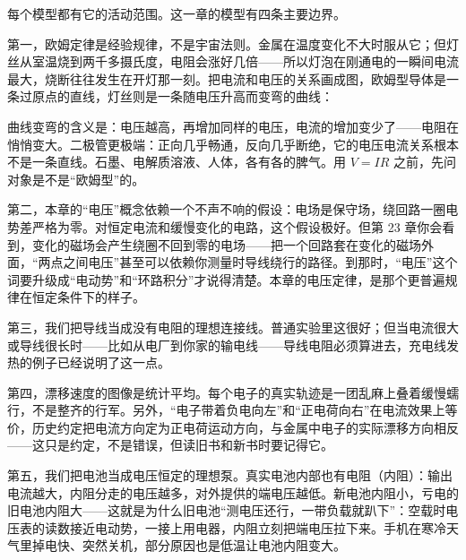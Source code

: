 
每个模型都有它的活动范围。这一章的模型有四条主要边界。

第一，欧姆定律是经验规律，不是宇宙法则。金属在温度变化不大时服从它；但灯丝从室温烧到两千多摄氏度，电阻会涨好几倍——所以灯泡在刚通电的一瞬间电流最大，烧断往往发生在开灯那一刻。把电流和电压的关系画成图，欧姆型导体是一条过原点的直线，灯丝则是一条随电压升高而变弯的曲线：

\begin{center}
\end{center}

曲线变弯的含义是：电压越高，再增加同样的电压，电流的增加变少了——电阻在悄悄变大。二极管更极端：正向几乎畅通，反向几乎断绝，它的电压电流关系根本不是一条直线。石墨、电解质溶液、人体，各有各的脾气。用 \(V=IR\) 之前，先问对象是不是“欧姆型”的。

第二，本章的“电压”概念依赖一个不声不响的假设：电场是保守场，绕回路一圈电势差严格为零。对恒定电流和缓慢变化的电路，这个假设极好。但第 23 章你会看到，变化的磁场会产生绕圈不回到零的电场——把一个回路套在变化的磁场外面，“两点之间电压”甚至可以依赖你测量时导线绕行的路径。到那时，“电压”这个词要升级成“电动势”和“环路积分”才说得清楚。本章的电压定律，是那个更普遍规律在恒定条件下的样子。

第三，我们把导线当成没有电阻的理想连接线。普通实验里这很好；但当电流很大或导线很长时——比如从电厂到你家的输电线——导线电阻必须算进去，充电线发热的例子已经说明了这一点。

第四，漂移速度的图像是统计平均。每个电子的真实轨迹是一团乱麻上叠着缓慢蠕行，不是整齐的行军。另外，“电子带着负电向左”和“正电荷向右”在电流效果上等价，历史约定把电流方向定为正电荷运动方向，与金属中电子的实际漂移方向相反——这只是约定，不是错误，但读旧书和新书时要记得它。

第五，我们把电池当成电压恒定的理想泵。真实电池内部也有电阻（内阻）：输出电流越大，内阻分走的电压越多，对外提供的端电压越低。新电池内阻小，亏电的旧电池内阻大——这就是为什么旧电池“测电压还行，一带负载就趴下”：空载时电压表的读数接近电动势，一接上用电器，内阻立刻把端电压拉下来。手机在寒冷天气里掉电快、突然关机，部分原因也是低温让电池内阻变大。

